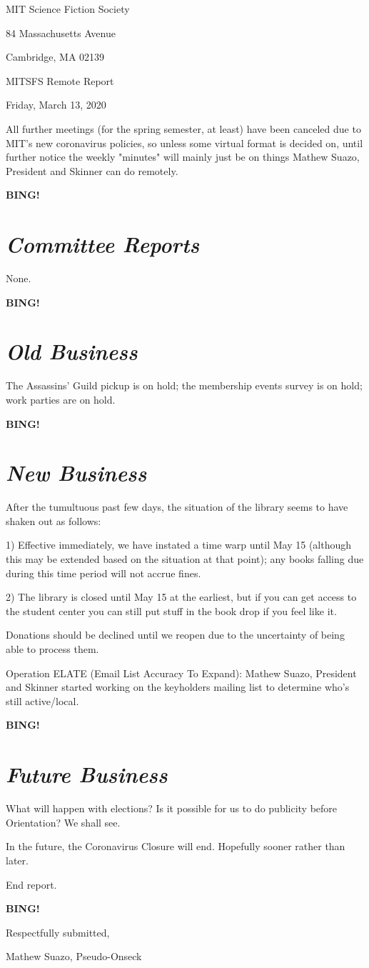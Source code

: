 \documentclass[10pt]{article}
\newcommand{\bing}{{\bf BING!} }
\newcommand{\goto}[1]{\bing \vskip 12pt \section*{{\em{#1}}}}
\newcommand{\skinner}{Mathew Suazo, President and Skinner\xspace}
\newcommand{\onseck}{Mathew Suazo, Pseudo-Onseck\xspace}
\newcommand{\meetingdate}{Friday, March 13, 2020}
\begin{document}
\begin{center}

MIT Science Fiction Society

84 Massachusetts Avenue

Cambridge, MA 02139

\vspace{12pt}

MITSFS Remote Report

\meetingdate

\end{center}

\vspace{18pt}

\setlength{\parskip}{6pt}

\noindent
All further meetings (for the spring semester, at least) have been canceled due to MIT's new coronavirus policies, so unless some virtual format is decided on, until further notice the weekly "minutes" will mainly just be on things \skinner can do remotely.

\goto{Committee Reports}

None.

\goto{Old Business}

The Assassins' Guild pickup is on hold; the membership events survey is on hold; work parties are on hold.

\goto{New Business}

After the tumultuous past few days, the situation of the library seems to have shaken out as follows:

1) Effective immediately, we have instated a time warp until May 15 (although this may be extended based on the situation at that point); any books falling due during this time period will not accrue fines.

2) The library is closed until May 15 at the earliest, but if you can get access to the student center you can still put stuff in the book drop if you feel like it.

Donations should be declined until we reopen due to the uncertainty of being able to process them.

Operation ELATE (Email List Accuracy To Expand): \skinner started working on the keyholders mailing list to determine who's still active/local.

\goto{Future Business}

What will happen with elections? Is it possible for us to do publicity before Orientation? We shall see.

In the future, the Coronavirus Closure will end. Hopefully sooner rather than later.

\noindent
End report.

\bing
\vspace{18pt}

\centerline{Respectfully submitted,}
\centerline{\onseck}
\end{document}
